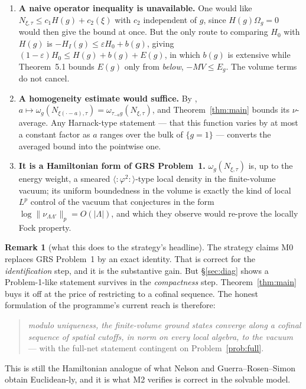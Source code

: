 \documentclass[11pt,a4paper]{article}
\theoremstyle{plain}
\theoremstyle{definition}
\newtheorem{remark}[theorem]{Remark}
\newcommand{\Om}{\Omega}
\begin{document}
\begin{enumerate}
\item \textbf{A naive operator inequality is unavailable.} One would like
      $N_{\xi,\tau}\le c_1H(g)+c_2(\xi)$ with $c_2$ independent of $g$, since $H(g)\Om_g=0$ would
      then give the bound at once. But the only route to comparing $H_0$ with $H(g)$ is
      $-H_{I}(g)\le\varepsilon H_0+b(g)$, giving
      $(1-\varepsilon)H_0\le H(g)+b(g)+E(g)$, in which $b(g)$ is extensive while Theorem~5.1
      bounds $E(g)$ only from \emph{below}, $-MV\le E_g$. The volume terms do not cancel.
\item \textbf{A homogeneity estimate would suffice.} By \cite[Lem.~3.2]{M0},
      $a\mapsto\omega_g(N_{\xi(\cdot-a),\tau})=\omega_{\tau_{-a}g}(N_{\xi,\tau})$, and
      Theorem~\ref{thm:main} bounds its $\nu$-average. Any Harnack-type statement --- that this
      function varies by at most a constant factor as $a$ ranges over the bulk of $\{g=1\}$ ---
      converts the averaged bound into the pointwise one.
\item \textbf{It is a Hamiltonian form of GRS Problem~1.} $\omega_g(N_{\xi,\tau})$ is, up to the
      energy weight, a smeared $\langle:\!\varphi^2\!:\rangle$-type local density in the
      finite-volume vacuum; its uniform boundedness in the volume is exactly the kind of local
      $L^p$ control of the vacuum that \cite[Problem~1]{GRS75} conjectures in the form
      $\log\|\nu_{\Lambda\Lambda'}\|_p=O(|\Lambda|)$, and which they observe would re-prove the
      locally Fock property.
\end{enumerate}

\begin{remark}[what this does to the strategy's headline]
The strategy claims M0 replaces GRS Problem~1 by an exact identity. That is correct for the
\emph{identification} step, and it is the substantive gain. But \S\ref{sec:diag} shows a
Problem-1-like statement survives in the \emph{compactness} step. Theorem~\ref{thm:main} buys it
off at the price of restricting to a cofinal sequence. The honest formulation of the programme's
current reach is therefore:
\begin{quote}
\emph{modulo uniqueness, the finite-volume ground states converge along a cofinal sequence of
spatial cutoffs, in norm on every local algebra, to the vacuum} ---
with the full-net statement contingent on Problem~\ref{prob:full}.
\end{quote}
This is still the Hamiltonian analogue of what Nelson and Guerra--Rosen--Simon obtain
Euclidean-ly, and it is what M2 verifies is correct in the solvable model.
\end{remark}
\end{document}
